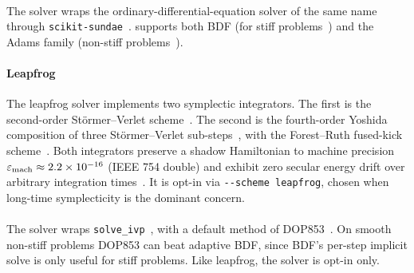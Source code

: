 \paragraph*{\CVODE{}} The \CVODE{}
solver wraps the \SUNDIALS{} ordinary-differential-equation solver of
the same name~\cite{gardner2022sundials,hindmarsh2005sundials} through
\lstinline!scikit-sundae!~\cite{randall2024skitsundae}.
\CVODE{} supports both BDF (for stiff
problems~\cite{hairer1996ode2}) and the Adams family
(non-stiff problems~\cite{hairer1993ode1}).

\paragraph*{Leapfrog}
The leapfrog solver implements two symplectic integrators. The first
is the second-order St\"ormer--Verlet
scheme~\cite{verlet1967computer,hairer2006geometric}.
The second is the fourth-order Yoshida composition of three
St\"ormer--Verlet sub-steps~\cite{yoshida1990symplectic},
with the Forest--Ruth fused-kick
scheme~\cite{forestruth1990fourth}.
Both integrators preserve a shadow Hamiltonian to
machine precision $\varepsilon_{\rm mach}\approx 2.2\times 10^{-16}$
(IEEE 754 double) and exhibit zero
secular energy drift over arbitrary integration
times~\cite{hairer2006geometric}. It is opt-in via
\lstinline!--scheme leapfrog!, chosen when long-time symplecticity is
the dominant concern.

\paragraph*{\SciPy{}} The \SciPy{}
solver wraps \lstinline!solve_ivp!~\cite{virtanen2020scipy},
with a default method of DOP853~\cite{hairer1993ode1,dormand1980runge}. On smooth non-stiff problems DOP853 can beat adaptive BDF, since
BDF's per-step implicit solve is only useful for stiff problems. Like leapfrog, the \SciPy{} solver is opt-in only.

